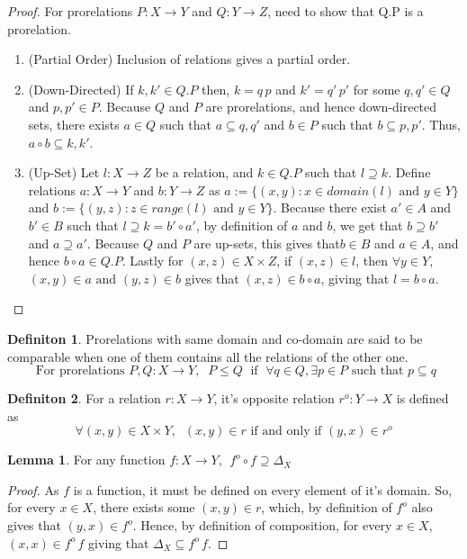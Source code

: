 \documentclass[18pt,a4paper]{article}
\theoremstyle{definition}
\newtheorem{definition}{Definiton}[section]
\newtheorem{lemma}{Lemma}[definition]
\begin{document}
\begin{proof}
	For prorelations $P:X \to Y$ and $Q:Y \to Z$, need to show that Q.P is a prorelation.
	\begin{enumerate}[label=(\roman*)]
		\item (Partial Order) Inclusion of relations gives a partial order.
		\item (Down-Directed) If $k,k' \in Q.P$ then, $k=q\,p$ and $k'=q'\,p'$ for some
		$q,q' \in Q$ and $p,p' \in P$. Because $Q$ and $P$ are prorelations,
		and hence down-directed sets, there exists $a \in Q$ such that
		$ a\subseteq q,q'$ and $b \in P$ such that $b \subseteq p,p'$. Thus,
		$a \circ b \subseteq k, k'$.
	\item (Up-Set) Let $l:X \to Z$ be a relation, and $k \in Q.P$ such that $l \supseteq k$.
		Define relations $ a:X \to Y $ and $b:Y \to Z$ as
		$a:=\{(x,y): x \in domain(l) \text{ and } y \in Y\}$ and
		$b:=\{(y,z): z \in range(l) \text{ and } y \in Y\}$.
		Because there exist $a'\in A$ and $b' \in B$ such that
		$l \supseteq k = b' \circ a'$, by definition of $a$ and $b$, we get that
		$b \supseteq b'$ and $a \supseteq a'$. Because $Q$ and $P$ are up-sets,
		this gives that$b \in B$ and $a \in A$, and hence $b\circ a \in Q.P$.
		Lastly for $(x,z) \in X \times Z$, if $(x,z) \in l$, then $\forall y \in Y$,
		$(x,y) \in a \text{ and } (y,z) \in b $ gives that $(x,z) \in b \circ a$,
		giving that $l=b \circ a$.
	\end{enumerate}
\end{proof}
\begin{definition} %
	Prorelations with same domain and co-domain are said to be comparable
	when one of them contains all the relations of the other one.
	\[\text{ For prorelations }  P,Q:X \to Y, \;\; P \leq Q \;\text{ if }\; \forall q \in Q, \exists p \in P
	\text{ such that } p \subseteq q    \]
\end{definition}
\begin{definition} %
	For a relation $r:X \to Y$, it's opposite relation $r^o:Y \to X$ is defined as
	\[ \forall (x,y)\in X \times Y, \; \;  (x,y)\in r \text{ if and only if }  (y,x) \in r^o \]
\end{definition}
\begin{lemma}
	For any function $f:X \to Y$, $ \; f^o \circ f \supseteq \Delta_X$
\end{lemma}
\begin{proof}
	As $f$ is a function, it must be defined on every element of it's domain. So, for every
	$x \in X$, there exists some $(x,y) \in r$, which, by definition of $f^o$ also gives
	that $(y,x) \in f^o$. Hence, by
	definition of composition, for every $x \in X$, $(x,x) \in f^o \,f$ giving that $\Delta_X
	\subseteq f^o \, f$.
\end{proof}
\end{document}
